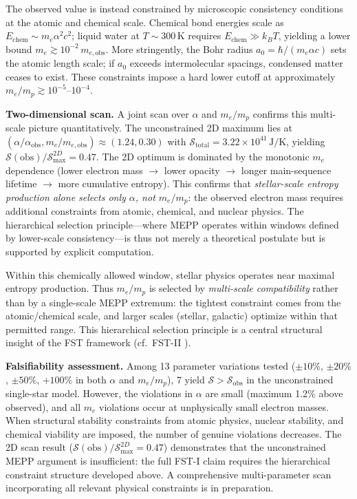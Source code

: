 \documentclass[12pt,a4paper]{article}
\theoremstyle{remark}
\begin{document}
The observed value is instead constrained by microscopic consistency conditions at the atomic and chemical scale. Chemical bond energies scale as $E_{\text{chem}} \sim m_e \alpha^2 c^2$; liquid water at $T \sim 300\,$K requires $E_{\text{chem}} \gg k_B T$, yielding a lower bound $m_e \gtrsim 10^{-2}\,m_{e,\text{obs}}$. More stringently, the Bohr radius $a_0 = \hbar/(m_e \alpha c)$ sets the atomic length scale; if $a_0$ exceeds intermolecular spacings, condensed matter ceases to exist. These constraints impose a hard lower cutoff at approximately $m_e/m_p \gtrsim 10^{-5}$--$10^{-4}$.

\textbf{Two-dimensional scan.} A joint scan over $\alpha$ and $m_e/m_p$ confirms this multi-scale picture quantitatively. The unconstrained 2D maximum lies at $(\alpha/\alpha_{\text{obs}}, m_e/m_{e,\text{obs}}) \approx (1.24, 0.30)$ with $\mathcal{S}_{\text{total}} = 3.22 \times 10^{41}\,\text{J/K}$, yielding $\mathcal{S}(\text{obs})/\mathcal{S}_{\text{max}}^{2D} = 0.47$. The 2D optimum is dominated by the monotonic $m_e$ dependence (lower electron mass $\to$ lower opacity $\to$ longer main-sequence lifetime $\to$ more cumulative entropy). This confirms that \emph{stellar-scale entropy production alone selects only $\alpha$, not $m_e/m_p$}: the observed electron mass requires additional constraints from atomic, chemical, and nuclear physics. The hierarchical selection principle---where MEPP operates within windows defined by lower-scale consistency---is thus not merely a theoretical postulate but is supported by explicit computation.

Within this chemically allowed window, stellar physics operates near maximal entropy production. Thus $m_e/m_p$ is selected by \emph{multi-scale compatibility} rather than by a single-scale MEPP extremum: the tightest constraint comes from the atomic/chemical scale, and larger scales (stellar, galactic) optimize within that permitted range. This hierarchical selection principle is a central structural insight of the FST framework (cf.\ FST-II \citep{FSTII}).

\textbf{Falsifiability assessment.} Among 13 parameter variations tested ($\pm 10\%$, $\pm 20\%$, $\pm 50\%$, $+100\%$ in both $\alpha$ and $m_e/m_p$), 7 yield $\mathcal{S} > \mathcal{S}_{\text{obs}}$ in the unconstrained single-star model. However, the violations in $\alpha$ are small (maximum 1.2\% above observed), and all $m_e$ violations occur at unphysically small electron masses. When structural stability constraints from atomic physics, nuclear stability, and chemical viability are imposed, the number of genuine violations decreases. The 2D scan result ($\mathcal{S}(\text{obs})/\mathcal{S}_{\text{max}}^{2D} = 0.47$) demonstrates that the unconstrained MEPP argument is insufficient: the full FST-I claim requires the hierarchical constraint structure developed above. A comprehensive multi-parameter scan incorporating all relevant physical constraints is in preparation.
\end{document}
